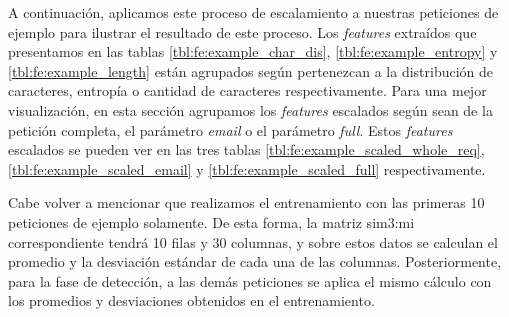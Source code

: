 A continuación, aplicamos este proceso de escalamiento a nuestras peticiones
de ejemplo para ilustrar el resultado de este proceso.
Los \textit{features} extraídos que presentamos en las tablas
\ref{tbl:fe:example_char_dis}, \ref{tbl:fe:example_entropy} y
\ref{tbl:fe:example_length} están agrupados según pertenezcan a
la distribución de caracteres, entropía o cantidad de caracteres
respectivamente.
Para una mejor visualización, en esta sección agrupamos los \textit{features}
escalados según sean de la petición completa, el parámetro \textit{email}
o el parámetro \textit{full}. Estos \textit{features} escalados se pueden
ver en las tres tablas \ref{tbl:fe:example_scaled_whole_req},
\ref{tbl:fe:example_scaled_email} y \ref{tbl:fe:example_scaled_full}
respectivamente.

Cabe volver a mencionar que realizamos el entrenamiento con las primeras
10 peticiones de ejemplo solamente. De esta forma, la matriz \gls{sim3:mi}
correspondiente tendrá 10 filas y 30 columnas, y sobre estos datos se
calculan el promedio y la desviación estándar de cada una de las columnas.
Posteriormente, para la fase de detección, a las demás peticiones se
aplica el mismo cálculo con los promedios y desviaciones obtenidos en
el entrenamiento.

